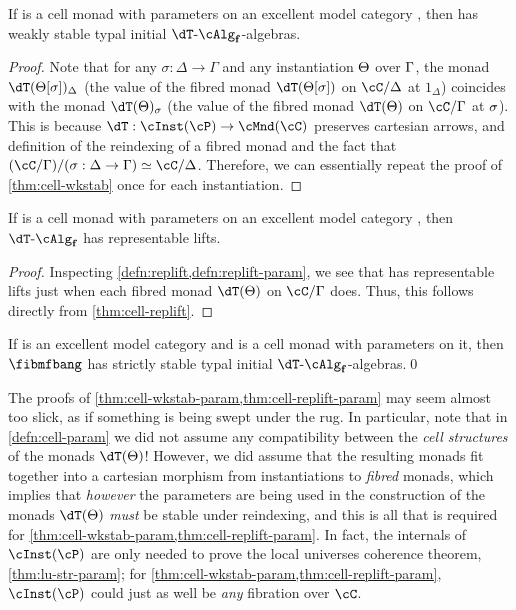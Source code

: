 \documentclass[referee]{psp}
\let\P\cP
\def\alg{\text{-}\cAlg}
\def\algf{\alg_{\mathbf{f}}}
\let\C\cC
\begin{document}
\begin{thm}\label{thm:cell-wkstab-param}
  If \dT is a cell monad with parameters on an excellent model category \sM, then \fibmf has weakly stable typal initial $\dT\algf$-algebras.
\end{thm}
\begin{proof}
  Note that for any $\sigma:\Delta\to\Gamma$ and any instantiation $\Theta$ over $\Gamma$, the monad $\dT(\Th[\si])_\De$ (the value of the fibred monad $\dT(\Th[\si])$ on $\C/\Delta$ at $1_\Delta$) coincides with the monad $\dT(\Th)_{\si}$ (the value of the fibred monad $\dT(\Th)$ on $\C/\Gamma$ at $\sigma$).
  This is because $\dT: \cInst(\P) \to \cMnd(\C)$ preserves cartesian arrows, and definition of the reindexing of a fibred monad and the fact that $(\C/\Gm)/(\si:\De\to\Gm) \simeq \C/\De$.
  Therefore, we can essentially repeat the proof of \cref{thm:cell-wkstab} once for each instantiation.
\end{proof}

\begin{thm}\label{thm:cell-replift-param}
  If \dT is a cell monad with parameters on an excellent model category \sM, then $\dT\algf$ has representable lifts.
\end{thm}
\begin{proof}
  Inspecting \cref{defn:replift,defn:replift-param}, we see that \dT has representable lifts just when each fibred monad $\dT(\Th)$ on $\C/\Gamma$ does.
  Thus, this follows directly from \cref{thm:cell-replift}.
\end{proof}

\begin{cor}\label{thm:cellmndparam}
  If \sM is an excellent model category and \dT is a cell monad with parameters on it, then $\fibmfbang$ has strictly stable typal initial $\dT\algf$-algebras.\qed
\end{cor}

The proofs of \cref{thm:cell-wkstab-param,thm:cell-replift-param} may seem almost too slick, as if something is being swept under the rug.
In particular, note that in \cref{defn:cell-param} we did not assume any compatibility between the \emph{cell structures} of the monads $\dT(\Th)$!
However, we did assume that the resulting monads fit together into a cartesian morphism from instantiations to \emph{fibred} monads, which implies that \emph{however} the parameters are being used in the construction of the monads $\dT(\Th)$ \emph{must} be stable under reindexing, and this is all that is required for \cref{thm:cell-wkstab-param,thm:cell-replift-param}.
In fact, the internals of $\cInst(\P)$ are only needed to prove the local universes coherence theorem, \cref{thm:lu-str-param}; for \cref{thm:cell-wkstab-param,thm:cell-replift-param}, $\cInst(\P)$ could just as well be \emph{any} fibration over $\C$.
\end{document}
